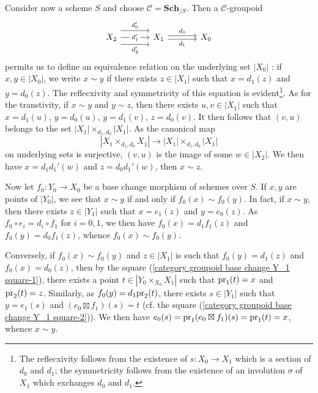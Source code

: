 Consider now a scheme $S$ and choose $\mathcal{C}=\mathbf{Sch}_{/S}$. Then a $\mathcal{C}$-groupoid
\[\begin{tikzcd}[column sep=12mm]
X_2\ar[r,shift left=8pt,"d_0'"]\ar[r,shift right=8pt,swap,"d_2'"]\ar[r,"d_1'"description]&X_1\ar[r,shift left=2pt,"d_0"]\ar[r,shift right=2pt,swap,"d_1"]&X_0
\end{tikzcd}\]
permits us to define an equivalence relation on the underlying set $|X_0|$ : if $x,y\in|X_0|$, we write $x\sim y$ if there exists $z\in|X_1|$ such that $x=d_1(z)$ and $y=d_0(z)$. The reflecxivity and symmetricity of this equation is evident\footnote{The reflecxivity follows from the existence of $s:X_0\to X_1$ which is a section of $d_0$ and $d_1$; the symmetricity follows from the existence of an involution $\sigma$ of $X_1$ which exchanges $d_0$ and $d_1$.}. As for the transtivity, if $x\sim y$ and $y\sim z$, then there exists $u,v\in |X_1|$ such that $x=d_1(u)$, $y=d_0(u)$, $y=d_1(v)$, $z=d_0(v)$. It then follows that $(v,u)$ belongs to the set $|X_1|\times_{d_1,d_0}|X_1|$. As the canonical map
\[|X_1\times_{d_1,d_0}X_1|\to |X_1|\times_{d_1,d_0}|X_1|\]
on underlying sets is surjective, $(v,u)$ is the image of some $w\in|X_2|$. We then have $x=d_1d_1'(w)$ and $z=d_0d_1'(w)$, then $x\sim z$.\par
Now let $f_0:Y_0\to X_0$ be a base change morphism of schemes over $S$. If $x,y$ are points of $|Y_0|$, we see that $x\sim y$ if and only if $f_0(x)\sim f_0(y)$. In fact, if $x\sim y$, then there exists $z\in|Y_1|$ such that $x=e_1(z)$ and $y=e_0(z)$. As $f_0\circ e_i=d_i\circ f_1$ for $i=0,1$, we then have $f_0(x)=d_1f_1(z)$ and $f_0(y)=d_0f_1(z)$, whence $f_0(x)\sim f_0(y)$.\par
Conversely, if $f_0(x)\sim f_0(y)$ and $z\in|X_1|$ is such that $f_0(y)=d_1(z)$ and $f_0(x)=d_0(z)$, then by the square (\ref{category groupoid base change Y_1 square-1}), there exists a point $t\in|Y_0\times_{X_0}X_1|$ such that $\mathrm{pr}_1(t)=x$ and $\mathrm{pr}_2(t)=z$. Similarly, as $f_0(y)=d_1\mathrm{pr}_2(t)$, there exists $s\in|Y_1|$ such that $y=e_1(s)$ and $(e_0\boxtimes f_1)(s)=t$ (cf. the square (\ref{category groupoid base change Y_1 square-2})). We then have $e_0(s)=\mathrm{pr}_1(e_0\boxtimes f_1)(s)=\mathrm{pr}_1(t)=x$, whence $x\sim y$.

